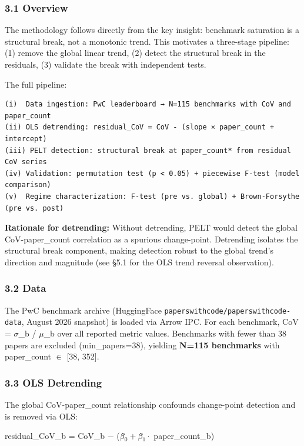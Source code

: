 
\subsubsection{3.1 Overview}

The methodology follows directly from the key insight: benchmark saturation is a structural break, not a monotonic trend. This motivates a three-stage pipeline: (1) remove the global linear trend, (2) detect the structural break in the residuals, (3) validate the break with independent tests.

The full pipeline:
\begin{verbatim}
(i)  Data ingestion: PwC leaderboard → N=115 benchmarks with CoV and paper_count
(ii) OLS detrending: residual_CoV = CoV - (slope × paper_count + intercept)
(iii) PELT detection: structural break at paper_count* from residual CoV series
(iv) Validation: permutation test (p < 0.05) + piecewise F-test (model comparison)
(v)  Regime characterization: F-test (pre vs. global) + Brown-Forsythe (pre vs. post)
\end{verbatim}

\textbf{Rationale for detrending:} Without detrending, PELT would detect the global CoV-paper\_count correlation as a spurious change-point. Detrending isolates the structural break component, making detection robust to the global trend's direction and magnitude (see §5.1 for the OLS trend reversal observation).

\subsubsection{3.2 Data}

The PwC benchmark archive (HuggingFace \texttt{paperswithcode/paperswithcode-data}, August 2026 snapshot) is loaded via Arrow IPC. For each benchmark, CoV = $\sigma$\_b / $\mu$\_b over all reported metric values. Benchmarks with fewer than 38 papers are excluded (min\_papers=38), yielding \textbf{N=115 benchmarks} with paper\_count $\in$ [38, 352].

\subsubsection{3.3 OLS Detrending}

The global CoV-paper\_count relationship confounds change-point detection and is removed via OLS:

residual\_CoV\_b = CoV\_b $-$ ($\beta$̂$_0 + \beta$̂$_1 \cdot$ paper\_count\_b)

